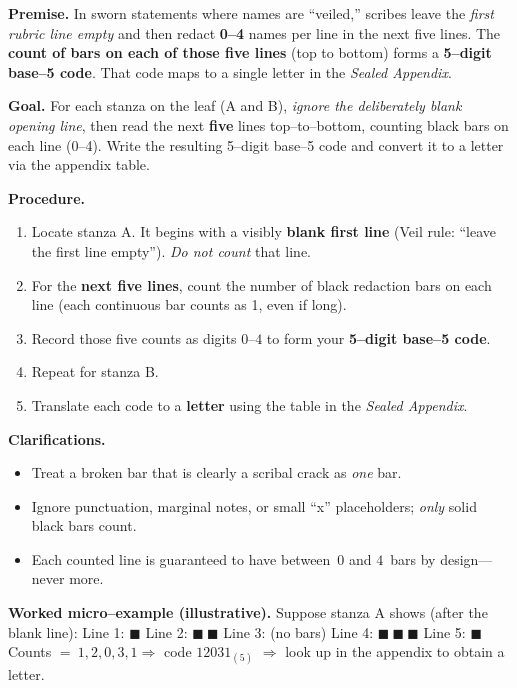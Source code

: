 \documentclass[11pt]{article}
\begin{document}
\begin{itemize}
\medskip
\noindent\textbf{Premise.} In sworn statements where names are “veiled,” scribes leave the \emph{first rubric line empty} and then redact \textbf{0–4} names per line in the next five lines. The \textbf{count of bars on each of those five lines} (top to bottom) forms a \textbf{5–digit base–5 code}. That code maps to a single letter in the \emph{Sealed Appendix}.

\medskip
\noindent\textbf{Goal.} For each stanza on the leaf (\textsc{A} and \textsc{B}), \emph{ignore the deliberately blank opening line}, then read the next \textbf{five} lines top–to–bottom, counting black bars on each line (0–4). Write the resulting 5–digit base–5 code and convert it to a letter via the appendix table.

\medskip
\noindent\textbf{Procedure.}
\begin{enumerate}\setlength\itemsep{0.2em}
  \item Locate stanza \textsc{A}. It begins with a visibly \textbf{blank first line} (Veil rule: “leave the first line empty”). \emph{Do not count} that line.
  \item For the \textbf{next five lines}, count the number of black redaction bars on each line (each continuous bar counts as 1, even if long).
  \item Record those five counts as digits \(0\)–\(4\) to form your \textbf{5–digit base–5 code}.
  \item Repeat for stanza \textsc{B}.
  \item Translate each code to a \textbf{letter} using the table in the \emph{Sealed Appendix}.
\end{enumerate}

\medskip
\noindent\textbf{Clarifications.}
\begin{itemize}\setlength\itemsep{0.25em}
  \item Treat a broken bar that is clearly a scribal crack as \emph{one} bar.
  \item Ignore punctuation, marginal notes, or small “x” placeholders; \emph{only} solid black bars count.
  \item Each counted line is guaranteed to have between \(\,0\) and \(4\,\) bars by design—never more.
\end{itemize}

\medskip
\noindent\textbf{Worked micro–example (illustrative).}  
Suppose stanza \textsc{A} shows (after the blank line):  
Line 1: \(\blacksquare\) \quad Line 2: \(\blacksquare\ \blacksquare\) \quad Line 3: (no bars) \quad Line 4: \(\blacksquare\ \blacksquare\ \blacksquare\) \quad Line 5: \(\blacksquare\)  
Counts \(=\ 1,2,0,3,1 \Rightarrow\) code \(12031_{(5)}\) \(\Rightarrow\) look up in the appendix to obtain a letter.


\end{itemize}
\end{document}
